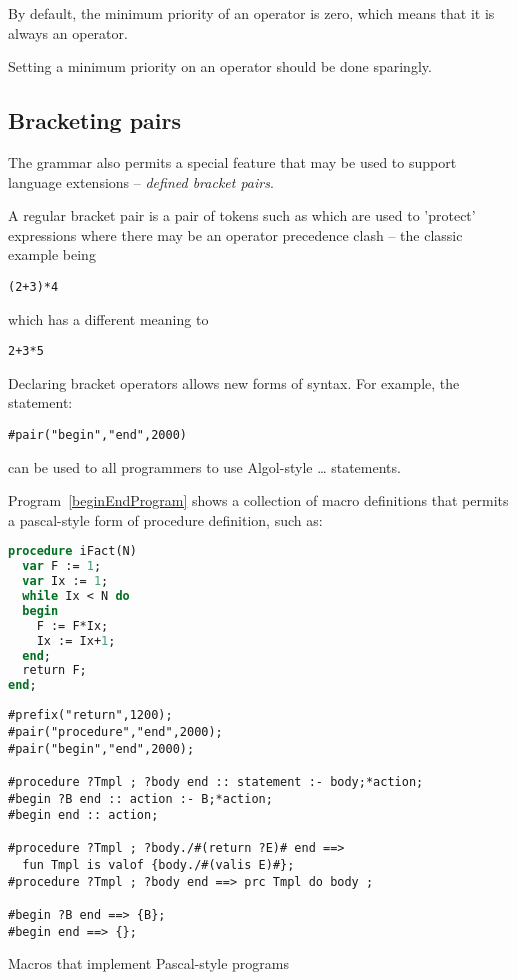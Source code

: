 By default, the minimum priority of an operator is zero, which means that it is always an operator.

\begin{aside}
Setting a minimum priority on an operator should be done sparingly.
\end{aside}

\subsection{Bracketing pairs}
The \Sr grammar also permits a special feature that may be used to support language extensions -- \emph{defined bracket pairs}.

A regular bracket pair is a pair of tokens such as \q{()} which are used to 'protect' expressions where there may be an operator precedence clash -- the classic example being 
\begin{lstlisting}
(2+3)*4
\end{lstlisting}
which has a different meaning to
\begin{lstlisting}
2+3*5
\end{lstlisting}

Declaring bracket operators allows new forms of syntax. For example, the statement:
\begin{lstlisting}
#pair("begin","end",2000)
\end{lstlisting}
can be used to all programmers to use Algol-style \ldots{} statements. 

Program~\vref{beginEndProgram} shows a collection of macro definitions
that permits a pascal-style form of procedure definition, such as:
\begin{lstlisting}[language=Pascal]
procedure iFact(N)
  var F := 1;
  var Ix := 1;
  while Ix < N do 
  begin
    F := F*Ix;
    Ix := Ix+1;
  end;
  return F;
end;
\end{lstlisting}

\begin{program}
\begin{lstlisting}
#prefix("return",1200);
#pair("procedure","end",2000);
#pair("begin","end",2000);
  
#procedure ?Tmpl ; ?body end :: statement :- body;*action;
#begin ?B end :: action :- B;*action;
#begin end :: action;

#procedure ?Tmpl ; ?body./#(return ?E)# end ==> 
  fun Tmpl is valof {body./#(valis E)#};
#procedure ?Tmpl ; ?body end ==> prc Tmpl do body ;

#begin ?B end ==> {B};
#begin end ==> {};
\end{lstlisting}
\caption{Macros that implement Pascal-style programs\label{beginEndProgram}}
\end{program}

